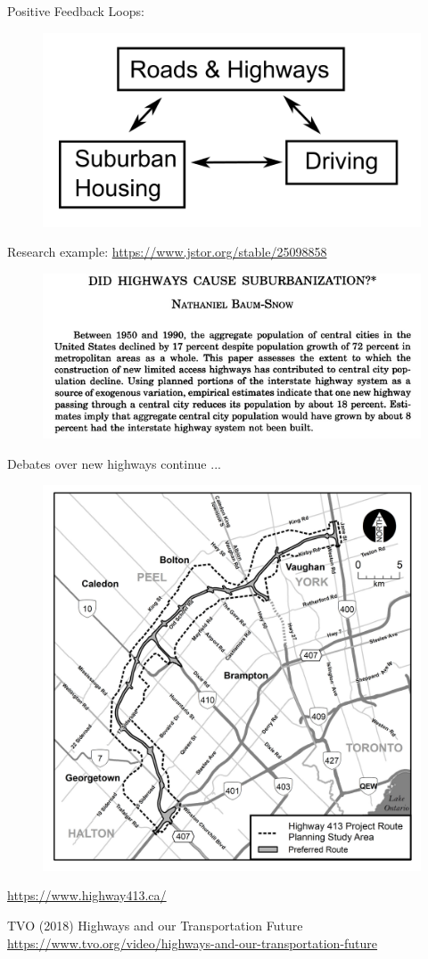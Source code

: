 \documentclass[aspectratio=169]{beamer}
\begin{document}
\begin{frame}
	
	Positive Feedback Loops:
	
	\begin{figure}
		\centering
		\includegraphics[width=0.4\linewidth]{images/feedback_suburb_driving.png}
	\end{figure}

	Research example: \small\url{https://www.jstor.org/stable/25098858}

\begin{figure}
	\centering
	\includegraphics[width=0.7\linewidth]{images/baumsnow_highways.png}
\end{figure}
		
\end{frame}

	



\begin{frame}
	
	Debates over new highways continue ...
	
	\begin{figure}
		\centering
		\includegraphics[width=0.55\linewidth]{images/highway413.jpg}
		
	\end{figure}
	\tiny{\url{https://www.highway413.ca/}}
	\vspace{2mm}
	
	\tiny{TVO (2018) Highways and our Transportation Future \url{https://www.tvo.org/video/highways-and-our-transportation-future}} 
	
\end{frame}
	
\end{document}
